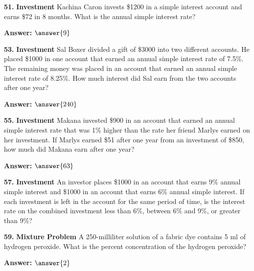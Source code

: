 \documentclass{ximera}
\begin{document}
\begin{problem}
\textbf{51.} \textbf{Investment} Kachina Caron invests \$1200 in a simple interest account and
  earns \$72 in 8 months. What is the annual simple interest rate?

\textbf{Answer:} $\answer{9}$
\end{problem}

\begin{problem}
\textbf{53.} \textbf{Investment} Sal Boxer divided a gift of \$3000 into two different
  accounts. He placed \$1000 in one account that earned an annual simple interest rate
  of 7.5\%. The remaining money was placed in an account that earned an annual simple
  interest rate of 8.25\%. How much interest did Sal earn from the two accounts after
  one year?

\textbf{Answer:} $\answer{240}$
\end{problem}

\begin{problem}
\textbf{55.} \textbf{Investment} Makana invested \$900 in an account that earned an annual
  simple interest rate that was 1\% higher than the rate her friend Marlys earned on her
  investment. If Marlys earned \$51 after one year from an investment of \$850, how much
  did Makana earn after one year?

\textbf{Answer:} $\answer{63}$
\end{problem}

\begin{problem}
\textbf{57.} \textbf{Investment} An investor places \$1000 in an account that earns 9\% annual
  simple interest and \$1000 in an account that earns 6\% annual simple interest. If
  each investment is left in the account for the same period of time, is the interest
  rate on the combined investment less than 6\%, between 6\% and 9\%, or greater
  than 9\%?

\begin{multipleChoice}
\end{multipleChoice}
\end{problem}

\begin{problem}
\textbf{59.} \textbf{Mixture Problem} A 250-milliliter solution of a fabric dye contains 5 ml
  of hydrogen peroxide. What is the percent concentration of the hydrogen peroxide?

\textbf{Answer:} $\answer{2}$
\end{problem}
\end{document}
